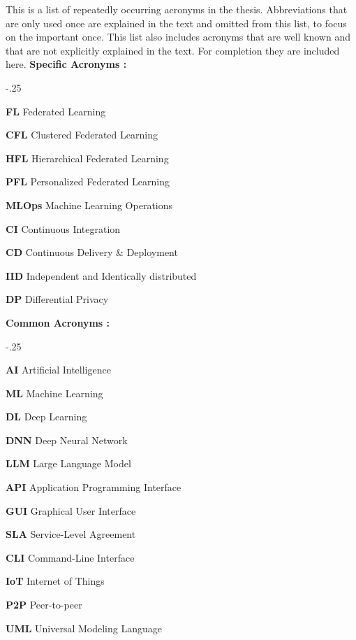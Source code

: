 This is a list of repeatedly occurring acronyms in the thesis.
Abbreviations that are only used once are explained in the text and omitted from this list,
to focus on the important once.
This list also includes acronyms that are well known and that are not explicitly explained in the text.
For completion they are included here.
\vspace{5mm}
\newline
\textbf{Specific Acronyms :}
\begin{acronym}
    \itemsep-.25\baselineskip
    \item[\textbf{FL}] Federated Learning 
    \item[\textbf{CFL}] Clustered Federated Learning 
    \item[\textbf{HFL}] Hierarchical Federated Learning 
    \item[\textbf{PFL}] Personalized Federated Learning 
    \item[\textbf{MLOps}] Machine Learning Operations
    \item[\textbf{CI}] Continuous Integration
    \item[\textbf{CD}] Continuous Delivery \& Deployment
    \item[\textbf{IID}] Independent and Identically distributed
    \item[\textbf{DP}] Differential Privacy 
\end{acronym}
\textbf{Common Acronyms :}
\begin{acronym}
    \itemsep-.25\baselineskip
    \item[\textbf{AI}] Artificial Intelligence
    \item[\textbf{ML}] Machine Learning
    \item[\textbf{DL}] Deep Learning
    \item[\textbf{DNN}] Deep Neural Network
    \item[\textbf{LLM}] Large Language Model
    \item[\textbf{API}] Application Programming Interface
    \item[\textbf{GUI}] Graphical User Interface
    \item[\textbf{SLA}] Service-Level Agreement
    \item[\textbf{CLI}] Command-Line Interface
    \item[\textbf{IoT}] Internet of Things
    \item[\textbf{P2P}] Peer-to-peer
    \item[\textbf{UML}] Universal Modeling Language
\end{acronym}